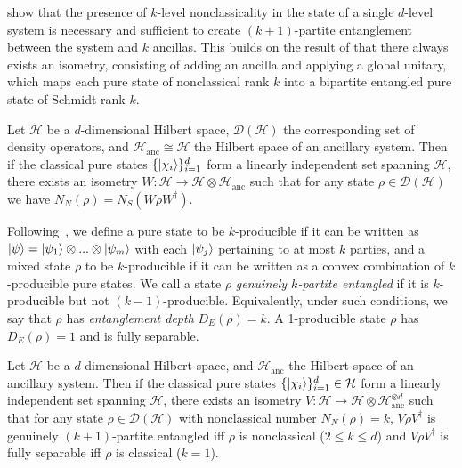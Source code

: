 \documentclass[12pt]{report}
\newcommand{\on}[1]{\operatorname{#1}}
\newcommand{\calH}{{\mathcal{H}}}
\begin{document}
\cite{regula2017converting} show that the presence of $k$-level nonclassicality in the state of a single $d$-level system is necessary and sufficient to create $(k+1)$-partite entanglement between the system and $k$ ancillas.
This builds on the result of \cite{killoran2016converting} that there always exists an isometry, consisting of adding an ancilla and applying a global unitary, which maps each pure state of nonclassical rank $k$ into a bipartite entangled pure state of Schmidt rank $k$.

\begin{thm}
	\renewcommand{\DH}{\mathcal D(\calH{})}
	\newcommand{\calHanc}{\calH_{\on{anc}}}
	Let $\calH$ be a $d$-dimensional Hilbert space, $\DH{}$ the corresponding set of density operators,
	and $\calHanc{} \cong \calH{}$ the Hilbert space of an ancillary system.
	Then if the classical pure states $\{ \ket{\chi_i} \}_{i=1}^d$ form a linearly independent set spanning $\calH{}$,
	there exists an isometry $W: \calH{} \to \calH{} \otimes \calHanc{}$ such that for any state $\rho \in \DH{}$ we have
	$N_N(\rho) = N_S(W \rho W^\dagger)$.
\end{thm}
 
Following~\cite{ghne2005multipartite}, we define a pure state to be $k$-producible if it can be written as
$\ket\psi = \ket{\psi_1} \otimes ... \otimes \ket{\psi_m}$ with each $\ket{\psi_j}$ pertaining to at most $k$ parties,
and a mixed state $\rho$ to be $k$-producible if it can be written as a convex combination of $k$-producible pure states.
We call a state $\rho$ \emph{genuinely $k$-partite entangled} if it is $k$-producible but not $(k-1)$-producible.
Equivalently, under such conditions, we say that $\rho$ has \emph{entanglement depth} $D_E(\rho) = k$.
A 1-producible state $\rho$ has $D_E(\rho)=1$ and is fully separable.

\begin{thm}
	\renewcommand{\DH}{\mathcal D(\calH{})}
	\newcommand{\aHanc}{\mathcal H_{\on{anc}}}
	Let $\calH$ be a $d$-dimensional Hilbert space, and $\aHanc$ the Hilbert space of an ancillary system.
	Then if the classical pure states $\{ \ket{\chi_i} \}_{i=1}^d \in \calH$ form a linearly independent set spanning $\calH$, there exists an isometry $V: \calH\to\calH\otimes\aHanc^{\otimes d}$
	such that for any state $\rho\in\DH$ with nonclassical number $N_N(\rho)=k$,
	$V \rho V^\dagger$ is genuinely $(k+1)$-partite entangled iff $\rho$ is nonclassical ($2\le k\le d$)
	and $V\rho V^\dagger$ is fully separable iff $\rho$ is classical ($k=1$).
\end{thm}
\end{document}
